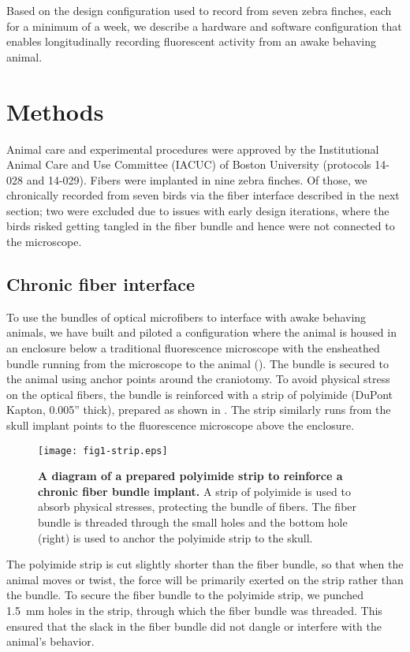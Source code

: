 Based on the design configuration used to record from 
seven zebra finches, each for a minimum of a week, we 
describe a hardware and software configuration that 
enables longitudinally recording fluorescent activity 
from an awake behaving animal.

\section{Methods}

Animal care and experimental procedures were 
approved by the Institutional Animal Care and Use Committee (IACUC) 
of Boston University (protocols 14-028 and 14-029). Fibers were 
implanted in nine zebra finches. Of those, we chronically recorded 
from seven birds via the fiber interface described in the next section; 
two were excluded due to issues with early design iterations, 
where the birds risked getting tangled in the fiber bundle and hence 
were not connected to the microscope.

\subsection{Chronic fiber interface}

To use the bundles of optical microfibers to interface 
with awake behaving animals, we have built and piloted 
a configuration where the animal is housed in an enclosure 
below a traditional fluorescence microscope with the 
ensheathed bundle running from the microscope to 
the animal (). The bundle is secured to the animal using 
anchor points around the craniotomy. To avoid physical 
stress on the optical fibers, the bundle is reinforced 
with a strip of polyimide (DuPont Kapton, 0.005'' thick),
prepared as shown in . The strip 
similarly runs from the skull implant points to the 
fluorescence microscope above the enclosure.

\begin{figure}
\texttt{[image: fig1-strip.eps]}
\caption[Polyimide to reinforce fiber bundle]{\textbf{A diagram
of a prepared polyimide strip to reinforce a chronic fiber 
bundle implant.} A strip of polyimide is used to absorb physical 
stresses, protecting the bundle of fibers. The fiber bundle is 
threaded through the small holes and the bottom hole (right) is 
used to anchor the polyimide strip to the skull.}
\label{fig:strip}
\end{figure}

The polyimide strip is cut slightly shorter than the fiber 
bundle, so that when the animal moves or twist, the force 
will be primarily exerted on the strip rather than the bundle.
To secure the fiber bundle to the polyimide strip, we 
punched 1.5~mm holes in the strip, through which the 
fiber bundle was threaded. This ensured that the slack 
in the fiber bundle did not dangle or interfere with 
the animal's behavior.


